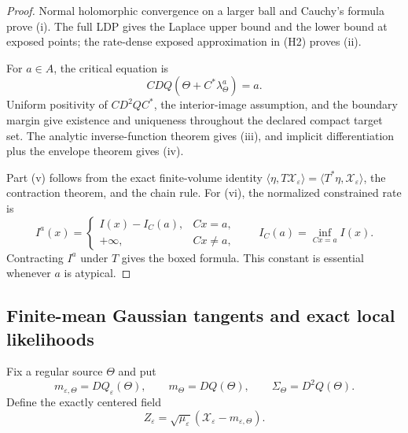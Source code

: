 \begin{proof}
Normal holomorphic convergence on a larger ball and Cauchy's formula prove
(i).  The full LDP gives the Laplace upper bound and the lower bound at exposed
points; the rate-dense exposed approximation in (H2) proves (ii).

For \(a\in A\), the critical equation is
\[
 CDQ(\Theta+C^*\lambda_\Theta^a)=a.
\]
Uniform positivity of \(CD^2QC^*\), the interior-image assumption, and the
boundary margin give existence and uniqueness throughout the declared compact
target set.  The analytic inverse-function theorem gives (iii), and
implicit differentiation plus the envelope theorem gives (iv).

Part (v) follows from the exact finite-volume identity
\(\langle\eta,T\mathcal X_\varepsilon\rangle
 =\langle T^*\eta,\mathcal X_\varepsilon\rangle\), the contraction theorem,
and the chain rule.  For (vi), the normalized constrained rate is
\[
 I^a(x)=
 \begin{cases}
 I(x)-I_C(a),&Cx=a,\\
 +\infty,&Cx\ne a,
 \end{cases}
 \qquad I_C(a)=\inf_{Cx=a}I(x).
\]
Contracting \(I^a\) under \(T\) gives the boxed formula.  This constant is
essential whenever \(a\) is atypical.
\end{proof}

\subsection{Finite-mean Gaussian tangents and exact local likelihoods}

Fix a regular source \(\Theta\) and put
\[
 m_{\varepsilon,\Theta}=DQ_\varepsilon(\Theta),
 \qquad
 m_\Theta=DQ(\Theta),
 \qquad
 \Sigma_\Theta=D^2Q(\Theta).
\]
Define the exactly centered field
\[
 Z_\varepsilon
 =\sqrt{\mu_\varepsilon}
 (\mathcal X_\varepsilon-m_{\varepsilon,\Theta}).
\]

